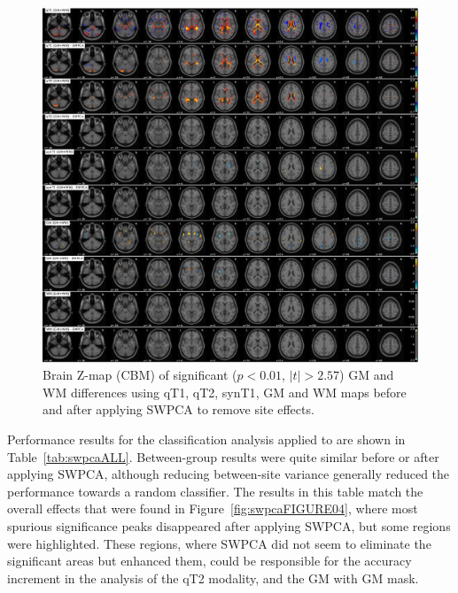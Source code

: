 \begin{figure}
	\centering
	\includegraphics[width=\linewidth]{Graphics/ch7/FIGURE05}
	\caption[Brain Z-map (\acs{CBM}) of significant ($p<0.01$, $|t|>2.57$) \acs{GM} and \acs{WM} differences using \acs{qT1}, \acs{qT2}, \acs{synT1}, \acs{GM} and \acs{WM} maps before and after applying \acs{SWPCA} to remove site effects.]{Brain Z-map (\ac{CBM}) of significant ($p<0.01$, $|t|>2.57$) \acs{GM} and \acs{WM} differences using \ac{qT1}, \ac{qT2}, \ac{synT1}, \ac{GM} and \ac{WM} maps before and after applying \ac{SWPCA} to remove site effects.}
	\label{fig:swpcaFIGURE05}
\end{figure}

Performance results for the classification analysis applied to \all{} are shown in Table~\ref{tab:swpcaALL}. Between-group results were quite similar before or after applying \ac{SWPCA}, although reducing between-site variance generally reduced the performance towards a random classifier. The results in this table match the overall effects that were found in Figure~\ref{fig:swpcaFIGURE04}, where most spurious significance peaks disappeared after applying \ac{SWPCA}, but some regions were highlighted. These regions, where \ac{SWPCA} did not seem to eliminate the significant areas but enhanced them, could be responsible for the accuracy increment in the analysis of the \ac{qT2} modality, and the \ac{GM} with \ac{GM} mask.

